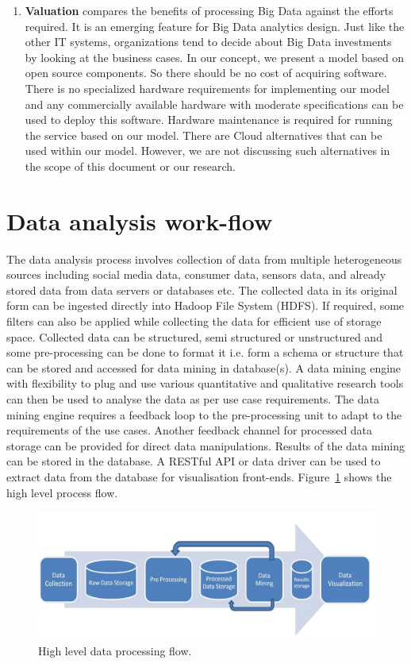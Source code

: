 \begin{enumerate}
\item \textbf{Valuation} compares the benefits of processing Big Data against the efforts required. It is an emerging feature for Big Data analytics design. Just like the other IT systems, organizations tend to decide about Big Data investments by looking at the business cases. In our concept, we present a model based on open source components. So there should be no cost of acquiring software. There is no specialized hardware requirements for implementing our model and any commercially available hardware with moderate specifications can be used to deploy this software. Hardware maintenance is required for running the service based on our model. There are Cloud alternatives that can be used within our model. However, we are not discussing such alternatives in the scope of this document or our research.    
\end{enumerate} 
\section{Data analysis work-flow} \label{workflow}
 The data analysis process involves collection of data from multiple heterogeneous sources including social media data, consumer data, sensors data, and already stored data from data servers or databases etc. The collected data in its original form can be ingested directly into Hadoop File System (HDFS). If required, some filters can also be applied while collecting the data for efficient use of storage space. Collected data can be structured, semi structured or unstructured and some pre-processing can be done to format it i.e. form a schema or structure that can be stored and accessed for data mining in database(s). A data mining engine with flexibility to plug and use various quantitative and qualitative research tools can then be used to analyse the data as per use case requirements. The data mining engine requires a feedback loop to the pre-processing unit to adapt to the requirements of the use cases. Another feedback channel for processed data storage can be provided for direct data manipulations. Results of the data mining can be stored in the database. A RESTful API or data driver can be used to extract data from the database for visualisation front-ends. Figure~\ref{fig:process} shows the high level process flow.
 \begin{figure}[!h]
   \begin{center}
     \includegraphics[width=\textwidth]{images/process.pdf}
     \caption{High level data processing flow.}
     \label{fig:process}
   \end{center}
 \end{figure} 
